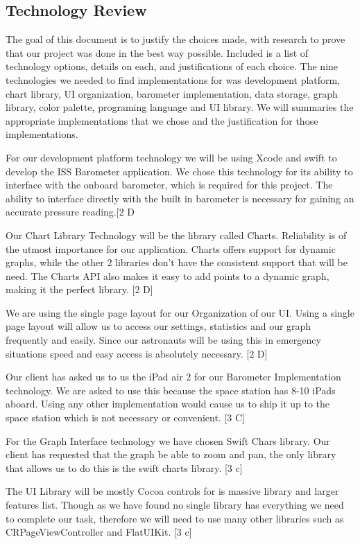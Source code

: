 \documentclass[onecolumn, draftclsnofoot,10pt, compsoc]{IEEEtran}
\begin{document}
\subsection{Technology Review}
The goal of this document is to justify the choices made, with research to prove that our project was done in the best way possible.
Included is a list of technology options, details on each, and justifications of each choice.
The nine technologies we needed to find implementations  for was development platform, chart library, UI organization, barometer implementation, data storage, graph library, color palette, programing language and UI library.
We will summaries the appropriate implementations that we chose and the justification for those implementations.

For our development platform technology we will be using Xcode and swift to develop the ISS Barometer application.
We chose this technology for its ability to interface with the onboard barometer, which is required for this project.
The ability to interface directly with the built in barometer is necessary for gaining an accurate pressure reading.[2 D


Our Chart Library Technology will be the library called Charts.
Reliability is of the utmost importance for our application.
Charts offers support for dynamic graphs, while the other 2 libraries don't have the consistent support that will be need.
The Charts API also makes it easy to add points to a dynamic graph, making it the perfect library. [2 D]

We are using the single page layout for our Organization of our UI.
Using a single page layout will allow us to access our settings, statistics and our graph frequently and easily.
Since our astronauts will be using this in emergency situations speed and easy access is absolutely necessary.  [2 D]

Our client has asked us to us the iPad air 2 for our Barometer Implementation technology.
We are asked to use this because the space station has 8-10 iPads aboard.
Using any other implementation would cause us to ship it up to the space station which is not necessary or convenient. [3 C]

For the Graph Interface technology we have chosen Swift Chars library.
Our client has requested that the graph be able to zoom and pan, the only library that allows us to do this is the swift charts library.  [3 c]

The UI Library will be mostly Cocoa controls for is massive library and larger features list.
Though as we have found no single library has everything we need to complete our task, therefore we will need to use many other libraries such as CRPageViewController and FlatUIKit. [3 c]
\end{document}
